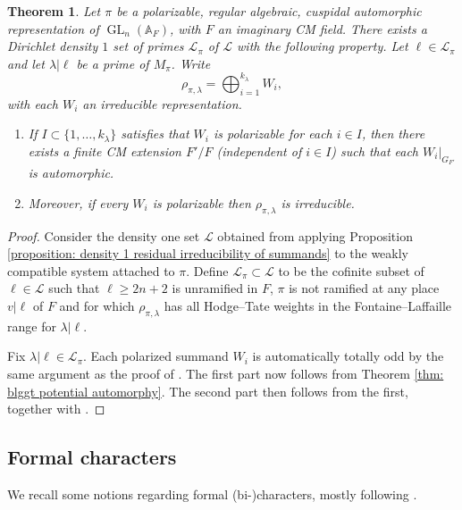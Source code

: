 \documentclass{amsart}
\newtheorem{theorem}{Theorem}[section]
\theoremstyle{definition}
\numberwithin{equation}{section} %
\newcommand{\GL}{\operatorname{GL}}
\newcommand{\bb}[1]{\mathbb{#1}}
\newcommand{\mc}[1]{\mathcal{#1}}
\begin{document}
\begin{theorem} \label{thm: irreducibility from polarized summands}
Let $\pi$ be a polarizable, regular algebraic, cuspidal automorphic representation of \( \GL_n(\bb{A}_F) \), with $F$ an imaginary CM field.
There exists a Dirichlet density $1$ set of primes $\mathcal{L}_\pi$ of $\mathcal{L}$ with the following property.
Let $\ell \in \mathcal{L}_\pi$ and let $\lambda|\ell$ be a prime of $M_\pi$.
Write
\[\rho_{\pi,\lambda} = \bigoplus_{i=1}^{k_\lambda} W_i,\]
with each $W_i$ an irreducible representation.
\begin{enumerate}
    \item If $I \subset \{1,\ldots,k_\lambda\}$ satisfies that $W_i$ is polarizable for each $i \in I$, then there exists a finite CM extension $F'/F$ (independent of \( i\in I \)) such that each $W_i|_{G_{F'}}$ is automorphic.
    \item Moreover, if every $W_i$ is polarizable then $\rho_{\pi,\lambda}$ is irreducible.
\end{enumerate}
\end{theorem}
\begin{proof}
Consider the density one set $\mathcal{L}$ obtained from applying Proposition \ref{proposition: density 1 residual irreducibility of summands} to the weakly compatible system attached to $\pi$.
Define $\mathcal{L}_\pi \subset \mathcal{L}$ to be the cofinite subset of $\ell \in \mc{L}$ such that $\ell \geq 2n+2$ is unramified in $F$, $\pi$ is not ramified at any place $v|\ell$ of $F$ and for which $\rho_{\pi,\lambda}$ has all Hodge--Tate weights in the Fontaine--Laffaille range for $\lambda|\ell$.

Fix $\lambda | \ell \in \mathcal{L}_\pi$.
Each polarized summand $W_i$ is automatically totally odd by the same argument as the proof of \cite[Proposition 4.8]{Hui23}.
The first part now follows from Theorem \ref{thm: blggt potential automorphy}.
The second part then follows from the first, together with \cite[Proposition 4.9]{Hui23}.
\end{proof}

\subsection{Formal characters} \label{subsect: formal characters}

We recall some notions regarding formal (bi-)characters, mostly following \cite[\S 2.3]{Hui23}.
\end{document}
